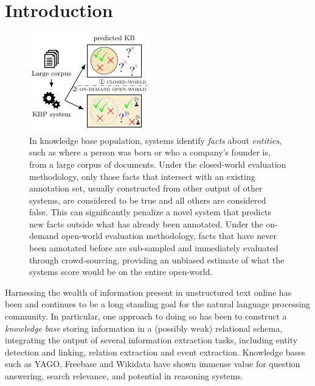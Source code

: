 \section{Introduction}
\label{sec:intro}

\begin{figure}
  \includegraphics[width=\columnwidth]{figures/overview}
  \caption{\label{fig:task}
  In knowledge base population, systems identify \textit{facts} about \textit{entities}, such as where a person was born or who a company's founder is, from a large corpus of documents.
  Under the closed-world evaluation methodology, only those facts that intersect with an existing annotation set, usually constructed from other output of other systems, are considered to be true and all others are considered false.
  This can significantly penalize a novel system that predicts new facts outside what has already been annotated.
  Under the on-demand open-world evaluation methodology, facts that have never been annotated before are sub-sampled and immediately evaluated through crowd-sourcing, providing an unbiased estimate of what the systems score would be on the entire open-world. 
  }
\end{figure}

Harnessing the wealth of information present in unstructured text online has been and continues to be a long standing goal for the natural language processing community.
In particular, one approach to doing so has been to construct a \textit{knowledge base} storing information in a (possibly weak) relational schema, integrating the output of several information extraction tasks, including entity detection and linking, relation extraction and event extraction.
Knowledge bases such as YAGO, Freebase and Wikidata have shown immense value for question answering, search relevance, and potential in reasoning systems\needcite.

